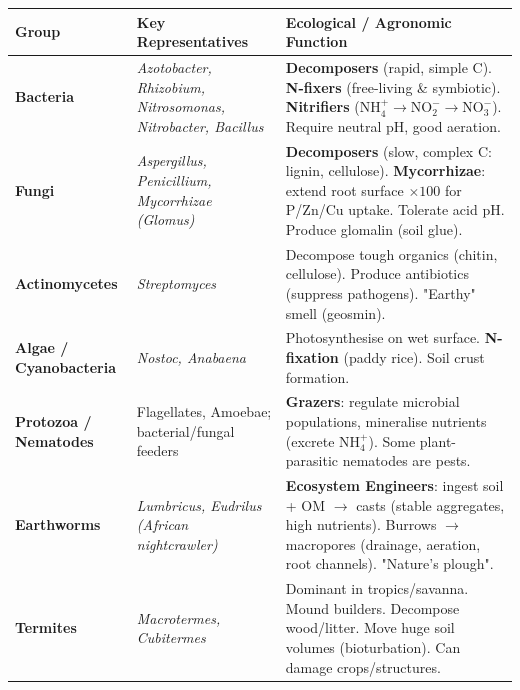 \documentclass[11pt]{article}
\begin{document}
\begin{center}
\begin{tabularx}{\linewidth}{|l|X|X|}\hline
\rowcolor{popblueL}
\textbf{Group} & \textbf{Key Representatives} & \textbf{Ecological / Agronomic Function} \\ \hline
\textbf{Bacteria} & \emph{Azotobacter, Rhizobium, Nitrosomonas, Nitrobacter, Bacillus} & \textbf{Decomposers} (rapid, simple C). \textbf{N-fixers} (free-living \& symbiotic). \textbf{Nitrifiers} ($\mathrm{NH_4^+ \to NO_2^- \to NO_3^-}$). Require neutral pH, good aeration. \\ \hline
\textbf{Fungi} & \emph{Aspergillus, Penicillium, Mycorrhizae (Glomus)} & \textbf{Decomposers} (slow, complex C: lignin, cellulose). \textbf{Mycorrhizae}: extend root surface $\times 100$ for P/Zn/Cu uptake. Tolerate acid pH. Produce glomalin (soil glue). \\ \hline
\textbf{Actinomycetes} & \emph{Streptomyces} & Decompose tough organics (chitin, cellulose). Produce antibiotics (suppress pathogens). "Earthy" smell (geosmin). \\ \hline
\textbf{Algae / Cyanobacteria} & \emph{Nostoc, Anabaena} & Photosynthesise on wet surface. \textbf{N-fixation} (paddy rice). Soil crust formation. \\ \hline
\textbf{Protozoa / Nematodes} & Flagellates, Amoebae; bacterial/fungal feeders & \textbf{Grazers}: regulate microbial populations, mineralise nutrients (excrete $\mathrm{NH_4^+}$). Some plant-parasitic nematodes are pests. \\ \hline
\textbf{Earthworms} & \emph{Lumbricus, Eudrilus (African nightcrawler)} & \textbf{Ecosystem Engineers}: ingest soil + OM $\to$ casts (stable aggregates, high nutrients). Burrows $\to$ macropores (drainage, aeration, root channels). "Nature's plough". \\ \hline
\textbf{Termites} & \emph{Macrotermes, Cubitermes} & Dominant in tropics/savanna. Mound builders. Decompose wood/litter. Move huge soil volumes (bioturbation). Can damage crops/structures. \\ \hline
\end{tabularx}
\end{center}
\end{document}
